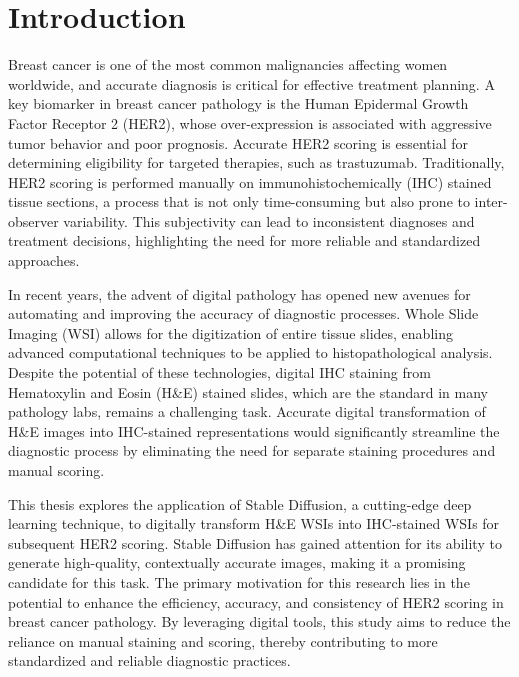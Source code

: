 

\chapter{Introduction}

\ifpdf
    \graphicspath{{1_introduction/figures/PNG/}{1_introduction/figures/PDF/}{1_introduction/figures/}}
\else
    \graphicspath{{1_introduction/figures/EPS/}{1_introduction/figures/}}
\fi


Breast cancer is one of the most common malignancies affecting women worldwide, and accurate diagnosis is critical for effective treatment planning. A key biomarker in breast cancer pathology is the Human Epidermal Growth Factor Receptor 2 (HER2), whose over-expression is associated with aggressive tumor behavior and poor prognosis. Accurate HER2 scoring is essential for determining eligibility for targeted therapies, such as trastuzumab. Traditionally, HER2 scoring is performed manually on immunohistochemically (IHC) stained tissue sections, a process that is not only time-consuming but also prone to inter-observer variability. This subjectivity can lead to inconsistent diagnoses and treatment decisions, highlighting the need for more reliable and standardized approaches.

In recent years, the advent of digital pathology has opened new avenues for automating and improving the accuracy of diagnostic processes. Whole Slide Imaging (WSI) allows for the digitization of entire tissue slides, enabling advanced computational techniques to be applied to histopathological analysis. Despite the potential of these technologies, digital IHC staining from Hematoxylin and Eosin (H\&E) stained slides, which are the standard in many pathology labs, remains a challenging task. Accurate digital transformation of H&E images into IHC-stained representations would significantly streamline the diagnostic process by eliminating the need for separate staining procedures and manual scoring.

This thesis explores the application of Stable Diffusion, a cutting-edge deep learning technique, to digitally transform H&E WSIs into IHC-stained WSIs for subsequent HER2 scoring. Stable Diffusion has gained attention for its ability to generate high-quality, contextually accurate images, making it a promising candidate for this task. The primary motivation for this research lies in the potential to enhance the efficiency, accuracy, and consistency of HER2 scoring in breast cancer pathology. By leveraging digital tools, this study aims to reduce the reliance on manual staining and scoring, thereby contributing to more standardized and reliable diagnostic practices.

